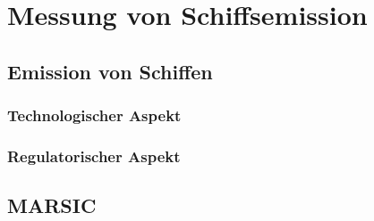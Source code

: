 
\chapter{Messung von Schiffsemission}


\section{Emission von Schiffen}


\subsection{Technologischer Aspekt}


\subsection{Regulatorischer Aspekt}


\section{MARSIC}


